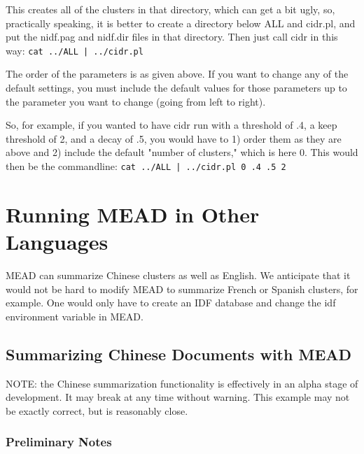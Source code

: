 \documentclass[10pt]{article}
\begin{document}
This creates all of the clusters in that directory, which can get a bit ugly, so, 
practically speaking, it is better to create a directory below ALL and cidr.pl, and put 
the nidf.pag and nidf.dir files in that directory.  Then just call cidr in this way: 
{\tt cat ../ALL | ../cidr.pl}

The order of the parameters is as given above.  If you want to change any of the 
default settings, you must include the default values for those parameters up to the 
parameter you want to change (going from left to right).

So, for example, if you wanted to have cidr run with a threshold of .4, a keep threshold 
of 2, and a decay of .5, you would have to 1) order them as they are above and 2) include 
the default "number of clusters," which is here 0. This would then be the commandline: 
{\tt cat ../ALL | ../cidr.pl 0 .4 .5 2}




\section{Running MEAD in Other Languages}

\noindent
MEAD can summarize Chinese clusters as well as English.  We anticipate
that it would not be hard to modify MEAD to summarize French or Spanish
clusters, for example.  One would only have to create an IDF database
and change the idf environment variable in MEAD.

\subsection{Summarizing Chinese Documents with MEAD}

NOTE: the Chinese summarization functionality is effectively in 
an alpha stage of development.  It may break at any time without
warning.  This example may not be exactly correct, but is 
reasonably close.\\

\subsubsection{Preliminary Notes}
\end{document}

